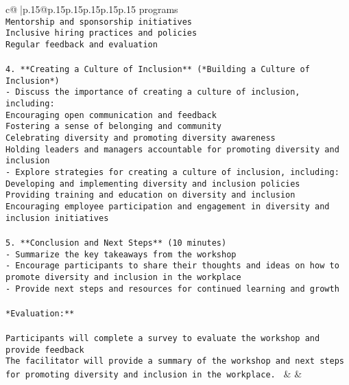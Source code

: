 \documentclass{article}
\begin{document}
{\begin{supertabular}{c@{$\;$}|p{.15\linewidth}@{}p{.15\linewidth}p{.15\linewidth}p{.15\linewidth}p{.15\linewidth}p{.15\linewidth}}
{{{programs\\ \tt      * Mentorship and sponsorship initiatives\\ \tt      * Inclusive hiring practices and policies\\ \tt      * Regular feedback and evaluation\\ \tt \\ \tt 4. **Creating a Culture of Inclusion** (*Building a Culture of Inclusion*)\\ \tt    - Discuss the importance of creating a culture of inclusion, including:\\ \tt      * Encouraging open communication and feedback\\ \tt      * Fostering a sense of belonging and community\\ \tt      * Celebrating diversity and promoting diversity awareness\\ \tt      * Holding leaders and managers accountable for promoting diversity and inclusion\\ \tt    - Explore strategies for creating a culture of inclusion, including:\\ \tt      * Developing and implementing diversity and inclusion policies\\ \tt      * Providing training and education on diversity and inclusion\\ \tt      * Encouraging employee participation and engagement in diversity and inclusion initiatives\\ \tt \\ \tt 5. **Conclusion and Next Steps** (10 minutes)\\ \tt    - Summarize the key takeaways from the workshop\\ \tt    - Encourage participants to share their thoughts and ideas on how to promote diversity and inclusion in the workplace\\ \tt    - Provide next steps and resources for continued learning and growth\\ \tt \\ \tt **Evaluation:**\\ \tt \\ \tt * Participants will complete a survey to evaluate the workshop and provide feedback\\ \tt * The facilitator will provide a summary of the workshop and next steps for promoting diversity and inclusion in the workplace. 
	  } 
	   } 
	   } 
	 & & \\ 
 

    \theutterance {}  


\end{supertabular}}
\end{document}
